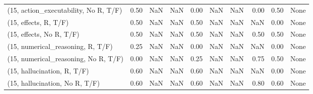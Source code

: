 \begin{table*}[h!]
\begin{adjustbox}{width=2\columnwidth,center}
\begin{tabular}{lrrr|rrr|rrr}
(15, action\_executability, No R, T/F) &                      0.50 &                   NaN &                       NaN &                          0.00 &                       NaN &                           NaN &                                   0.00 &                               0.50 &                                  None \\
(15, effects, R, T/F)                 &                      0.50 &                   NaN &                       NaN &                          0.50 &                       NaN &                           NaN &                                    NaN &                               0.00 &                                  None \\
(15, effects, No R, T/F)              &                      0.50 &                   NaN &                       NaN &                          0.50 &                       NaN &                           NaN &                                   0.50 &                               0.50 &                                  None \\
(15, numerical\_reasoning, R, T/F)     &                      0.25 &                   NaN &                       NaN &                          0.00 &                       NaN &                           NaN &                                    NaN &                               0.00 &                                  None \\
(15, numerical\_reasoning, No R, T/F)  &                      0.00 &                   NaN &                       NaN &                          0.25 &                       NaN &                           NaN &                                   0.75 &                               0.50 &                                  None \\
(15, hallucination, R, T/F)           &                      0.60 &                   NaN &                       NaN &                          0.60 &                       NaN &                           NaN &                                    NaN &                               0.00 &                                  None \\
(15, hallucination, No R, T/F)        &                      0.60 &                   NaN &                       NaN &                          0.60 &                       NaN &                           NaN &                                   0.80 &                               0.60 &                                  None \\

\end{tabular}
\end{adjustbox}
\end{table*}
